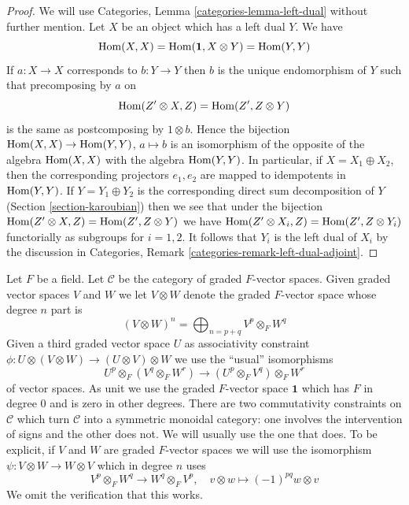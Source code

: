 \begin{proof}
We will use Categories, Lemma \ref{categories-lemma-left-dual}
without further mention.
Let $X$ be an object which has a left dual $Y$. We have
$$
\mathop{\mathrm{Hom}}\nolimits(X, X) = \mathop{\mathrm{Hom}}\nolimits(\mathbf{1}, X \otimes Y) = \mathop{\mathrm{Hom}}\nolimits(Y, Y)
$$
If $a : X \to X$ corresponds to $b : Y \to Y$ then $b$ is the unique
endomorphism of $Y$ such that precomposing by $a$ on
$$
\mathop{\mathrm{Hom}}\nolimits(Z' \otimes X, Z) = \mathop{\mathrm{Hom}}\nolimits(Z', Z \otimes Y)
$$
is the same as postcomposing by $1 \otimes b$.
Hence the bijection $\mathop{\mathrm{Hom}}\nolimits(X, X) \to \mathop{\mathrm{Hom}}\nolimits(Y, Y)$, $a \mapsto b$
is an isomorphism of the opposite of the algebra $\mathop{\mathrm{Hom}}\nolimits(X, X)$ with
the algebra $\mathop{\mathrm{Hom}}\nolimits(Y, Y)$. In particular, if $X = X_1 \oplus X_2$, then
the corresponding projectors $e_1, e_2$ are mapped to idempotents
in $\mathop{\mathrm{Hom}}\nolimits(Y, Y)$. If $Y = Y_1 \oplus Y_2$ is the corresponding direct
sum decomposition of $Y$ (Section \ref{section-karoubian})
then we see that under the bijection
$\mathop{\mathrm{Hom}}\nolimits(Z' \otimes X, Z) = \mathop{\mathrm{Hom}}\nolimits(Z', Z \otimes Y)$
we have $\mathop{\mathrm{Hom}}\nolimits(Z' \otimes X_i, Z) = \mathop{\mathrm{Hom}}\nolimits(Z', Z \otimes Y_i)$
functorially as subgroups for $i = 1, 2$.
It follows that $Y_i$ is the left dual of
$X_i$ by the discussion in
Categories, Remark \ref{categories-remark-left-dual-adjoint}.
\end{proof}

\begin{example}
\label{example-graded-vector-spaces}
Let $F$ be a field. Let $\mathcal{C}$ be the category of graded
$F$-vector spaces. Given graded vector spaces $V$ and $W$ we
let $V \otimes W$ denote the graded $F$-vector space whose
degree $n$ part is
$$
(V \otimes W)^n = \bigoplus\nolimits_{n = p + q} V^p \otimes_F W^q
$$
Given a third graded vector space $U$ as associativity constraint
$\phi : U \otimes (V \otimes W) \to (U \otimes V) \otimes W$
we use the ``usual'' isomorphisms
$$
U^p \otimes_F (V^q \otimes_F W^r) \to (U^p \otimes_F V^q) \otimes_F W^r
$$
of vector spaces. As unit we use the graded $F$-vector space $\mathbf{1}$
which has $F$ in degree $0$ and is zero in other degrees.
There are two commutativity constraints on $\mathcal{C}$
which turn $\mathcal{C}$ into a symmetric monoidal category: one involves the
intervention of signs and the other does not. We will usually
use the one that does. To be explicit, if $V$ and $W$ are graded $F$-vector
spaces we will use the isomorphism $\psi : V \otimes W \to W \otimes V$
which in degree $n$ uses
$$
V^p \otimes_F W^q \to W^q \otimes_F V^p,\quad
v \otimes w \mapsto (-1)^{pq} w \otimes v
$$
We omit the verification that this works.
\end{example}


